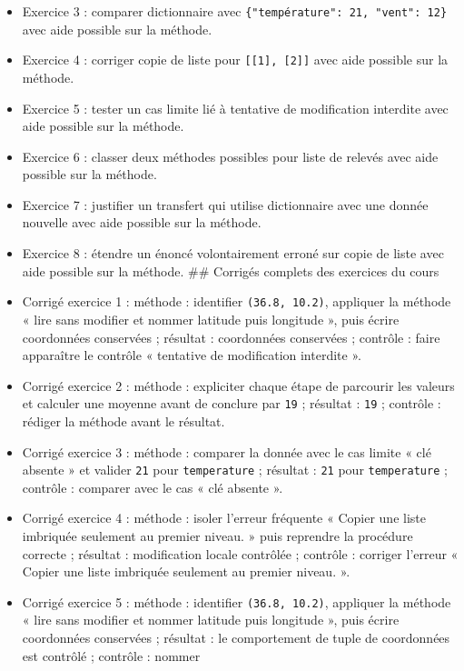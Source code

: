 \begin{itemize}
\item
  Exercice 3 : comparer dictionnaire avec
  \texttt{\{"température":\ 21,\ "vent":\ 12\}} avec aide possible sur
  la méthode.
\item
  Exercice 4 : corriger copie de liste pour
  \texttt{{[}{[}1{]},\ {[}2{]}{]}} avec aide possible sur la méthode.
\item
  Exercice 5 : tester un cas limite lié à tentative de modification
  interdite avec aide possible sur la méthode.
\item
  Exercice 6 : classer deux méthodes possibles pour liste de relevés
  avec aide possible sur la méthode.
\item
  Exercice 7 : justifier un transfert qui utilise dictionnaire avec une
  donnée nouvelle avec aide possible sur la méthode.
\item
  Exercice 8 : étendre un énoncé volontairement erroné sur copie de
  liste avec aide possible sur la méthode. \#\# Corrigés complets des
  exercices du cours
\item
  Corrigé exercice 1 : méthode : identifier \texttt{(36.8,\ 10.2)},
  appliquer la méthode « lire sans modifier et nommer latitude puis
  longitude », puis écrire coordonnées conservées ; résultat :
  coordonnées conservées ; contrôle : faire apparaître le contrôle «
  tentative de modification interdite ».
\item
  Corrigé exercice 2 : méthode : expliciter chaque étape de parcourir
  les valeurs et calculer une moyenne avant de conclure par \texttt{19}
  ; résultat : \texttt{19} ; contrôle : rédiger la méthode avant le
  résultat.
\item
  Corrigé exercice 3 : méthode : comparer la donnée avec le cas limite «
  clé absente » et valider \texttt{21} pour \texttt{temperature} ;
  résultat : \texttt{21} pour \texttt{temperature} ; contrôle : comparer
  avec le cas « clé absente ».
\item
  Corrigé exercice 4 : méthode : isoler l'erreur fréquente « Copier une
  liste imbriquée seulement au premier niveau. » puis reprendre la
  procédure correcte ; résultat : modification locale contrôlée ;
  contrôle : corriger l'erreur « Copier une liste imbriquée seulement au
  premier niveau. ».
\item
  Corrigé exercice 5 : méthode : identifier \texttt{(36.8,\ 10.2)},
  appliquer la méthode « lire sans modifier et nommer latitude puis
  longitude », puis écrire coordonnées conservées ; résultat : le
  comportement de tuple de coordonnées est contrôlé ; contrôle : nommer

\end{itemize}
